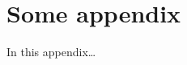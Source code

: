 \renewcommand{\thefigure}{A\arabic{figure}}
\section{Some appendix}
\label{appendix:something}

In this appendix\dots
